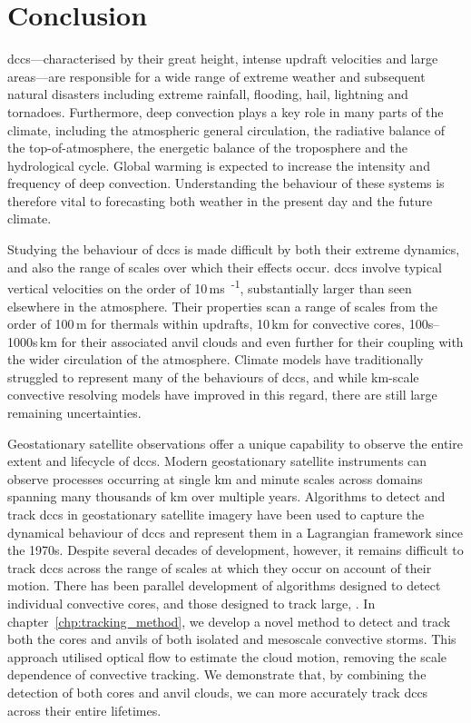 \chapter{Conclusion} \label{chp:conclusion}

\acrshort{dcc}s---characterised by their great height, intense updraft velocities and large areas---are responsible for a wide range of extreme weather and subsequent natural disasters including extreme rainfall, flooding, hail, lightning and tornadoes. 
Furthermore, deep convection plays a key role in many parts of the climate, including the atmospheric general circulation, the radiative balance of the top-of-atmosphere, the energetic balance of the troposphere and the hydrological cycle. 
Global warming is expected to increase the intensity and frequency of deep convection.
Understanding the behaviour of these systems is therefore vital to forecasting both weather in the present day and the future climate.

Studying the behaviour of \acrshort{dcc}s is made difficult by both their extreme dynamics, and also the range of scales over which their effects occur. 
\acrshort{dcc}s involve typical vertical velocities on the order of 10\,\unit{ms\textsuperscript{-1}}, substantially larger than seen elsewhere in the atmosphere. 
Their properties scan a range of scales from the order of 100\,\unit{m} for thermals within updrafts, 10\,\unit{km} for convective cores, 100s--1000s\,\unit{km} for their associated anvil clouds and even further for their coupling with the wider circulation of the atmosphere. 
Climate models have traditionally struggled to represent many of the behaviours of \acrshort{dcc}s, and while km-scale convective resolving models have improved in this regard, there are still large remaining uncertainties.

Geostationary satellite observations offer a unique capability to observe the entire extent and lifecycle of \acrshort{dcc}s. 
Modern geostationary satellite instruments can observe processes occurring at single km and minute scales across domains spanning many thousands of km over multiple years. 
Algorithms to detect and track \acrshort{dcc}s in geostationary satellite imagery have been used to capture the dynamical behaviour of \acrshort{dcc}s and represent them in a Lagrangian framework since the 1970s. 
Despite several decades of development, however, it remains difficult to track \acrshort{dcc}s across the range of scales at which they occur on account of their motion. 
There has been parallel development of algorithms designed to detect individual convective cores, and those designed to track large, . 
In chapter~\ref{chp:tracking_method}, we develop a novel method to detect and track both the cores and anvils of both isolated and mesoscale convective storms. 
This approach utilised optical flow to estimate the cloud motion, removing the scale dependence of convective tracking. 
We demonstrate that, by combining the detection of both cores and anvil clouds, we can more accurately track \acrshort{dcc}s across their entire lifetimes.


